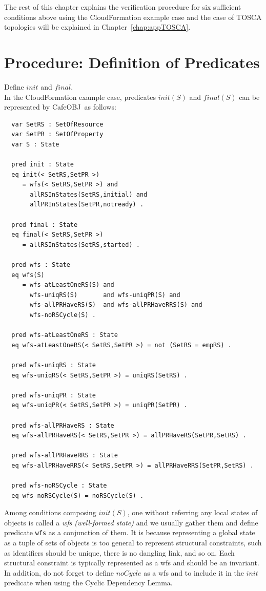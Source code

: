 \documentclass[12pt]{report}
\newcommand{\cafeobj}{{\sf CafeOBJ}~}
\begin{document}
The rest of this chapter explains the verification procedure for six
sufficient conditions above using the CloudFormation example case and
the case of TOSCA topologies will be explained in
Chapter~\ref{chap:appTOSCA}.

\section{Procedure: Definition of Predicates}
\label{sec:support}
 Define $init$ and $final$. \\ In the
CloudFormation example case, predicates $init(S)$ and $final(S)$ can
be represented by \cafeobj as follows:
\begin{verbatim}
  var SetRS : SetOfResource
  var SetPR : SetOfProperty
  var S : State

  pred init : State
  eq init(< SetRS,SetPR >)
     = wfs(< SetRS,SetPR >) and
       allRSInStates(SetRS,initial) and 
       allPRInStates(SetPR,notready) .

  pred final : State
  eq final(< SetRS,SetPR >)
     = allRSInStates(SetRS,started) .

  pred wfs : State
  eq wfs(S)
     = wfs-atLeastOneRS(S) and
       wfs-uniqRS(S)       and wfs-uniqPR(S) and 
       wfs-allPRHaveRS(S)  and wfs-allPRHaveRRS(S) and
       wfs-noRSCycle(S) .

  pred wfs-atLeastOneRS : State
  eq wfs-atLeastOneRS(< SetRS,SetPR >) = not (SetRS = empRS) .

  pred wfs-uniqRS : State
  eq wfs-uniqRS(< SetRS,SetPR >) = uniqRS(SetRS) .

  pred wfs-uniqPR : State
  eq wfs-uniqPR(< SetRS,SetPR >) = uniqPR(SetPR) .

  pred wfs-allPRHaveRS : State
  eq wfs-allPRHaveRS(< SetRS,SetPR >) = allPRHaveRS(SetPR,SetRS) .

  pred wfs-allPRHaveRRS : State
  eq wfs-allPRHaveRRS(< SetRS,SetPR >) = allPRHaveRRS(SetPR,SetRS) .

  pred wfs-noRSCycle : State
  eq wfs-noRSCycle(S) = noRSCycle(S) .
\end{verbatim}
Among conditions composing $init(S)$, one without referring any local
states of objects is called a {\it wfs (well-formed state)} and we
usually gather them and define predicate {\tt wfs} as a conjunction of
them. It is because representing a global state as a tuple of sets of
objects is too general to represent structural constraints, such as
identifiers should be unique, there is no dangling link, and so on. Each
structural constraint is typically represented as a wfs and should be
an invariant. In addition, do not forget to define $noCycle$ as a wfs
and to include it in the $init$ predicate when using the Cyclic
Dependency Lemma.\\
\end{document}
